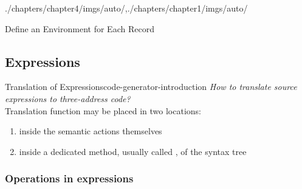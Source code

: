 \begin{graphicspathcontext}{{./chapters/chapter4/imgs/auto/},{./chapters/chapter1/imgs/auto/}}
\begin{bibunit}[apalike]
\begin{frame}{{Define an Environment} for Each Record}
	\vspace{.25cm}
	\begin{sdd}
	\end{sdd}
	\vspace{.25cm}
\end{frame}

\subsection{Expressions}
\resetsectionsintoc
\subsectiontableofcontentslide

\begin{leftlawnframe}{Translation of Expressions}{code-generator-introduction}
	\emph{How to translate source expressions to three-address code?} \\[.25cm]
	Translation function may be placed in two locations:
	\begin{enumerate}
		\item inside the semantic actions themselves
		\item inside a dedicated method, usually called , of the syntax tree
	\end{enumerate}
\end{leftlawnframe}

\subsubsection{Operations in expressions}
\subsubsectiontableofcontentslide


\end{bibunit}
\end{graphicspathcontext}
